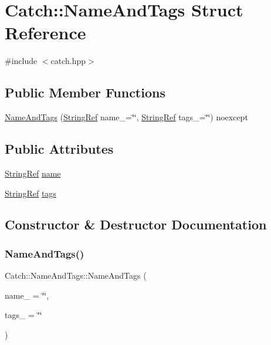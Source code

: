 \hypertarget{structCatch_1_1NameAndTags}{}\section{Catch\+:\+:Name\+And\+Tags Struct Reference}
\label{structCatch_1_1NameAndTags}


{\ttfamily \#include $<$catch.\+hpp$>$}

\subsection*{Public Member Functions}
\begin{DoxyCompactItemize}
\item 
\mbox{\hyperlink{structCatch_1_1NameAndTags_a7ed5e01c5b81b1d23a4768460699c914}{Name\+And\+Tags}} (\mbox{\hyperlink{classCatch_1_1StringRef}{String\+Ref}} name\+\_\+=\char`\"{}\char`\"{}, \mbox{\hyperlink{classCatch_1_1StringRef}{String\+Ref}} tags\+\_\+=\char`\"{}\char`\"{}) noexcept
\end{DoxyCompactItemize}
\subsection*{Public Attributes}
\begin{DoxyCompactItemize}
\item 
\mbox{\hyperlink{classCatch_1_1StringRef}{String\+Ref}} \mbox{\hyperlink{structCatch_1_1NameAndTags_a7cbea60e0cebfa622c667008eb011420}{name}}
\item 
\mbox{\hyperlink{classCatch_1_1StringRef}{String\+Ref}} \mbox{\hyperlink{structCatch_1_1NameAndTags_a74062ed1138834a348424eb7ed900c57}{tags}}
\end{DoxyCompactItemize}


\subsection{Constructor \& Destructor Documentation}
\mbox{\label{structCatch_1_1NameAndTags_a7ed5e01c5b81b1d23a4768460699c914}} 
\subsubsection{\texorpdfstring{Name\+And\+Tags()}{NameAndTags()}}
{\footnotesize\ttfamily Catch\+::\+Name\+And\+Tags\+::\+Name\+And\+Tags (\begin{DoxyParamCaption}\item[{\mbox{\hyperlink{classCatch_1_1StringRef}{String\+Ref}}}]{name\+\_\+ = {\ttfamily \char`\"{}\char`\"{}},  }\item[{\mbox{\hyperlink{classCatch_1_1StringRef}{String\+Ref}}}]{tags\+\_\+ = {\ttfamily \char`\"{}\char`\"{}} }\end{DoxyParamCaption})\hspace{0.3cm}{\ttfamily [noexcept]}}



